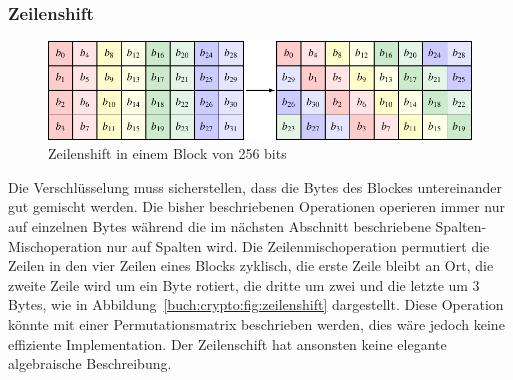 \subsubsection{Zeilenshift}
\begin{figure}
\centering
\includegraphics[width=\textwidth]{chapters/90-crypto/images/shift.pdf}
\caption{Zeilenshift in einem Block von 256 bits
\label{buch:crypto:fig:shift}}
\end{figure}
Die Verschlüsselung muss sicherstellen, dass die Bytes des Blockes
untereinander gut gemischt werden.
Die bisher beschriebenen Operationen operieren immer nur auf einzelnen
Bytes während
die im nächsten Abschnitt beschriebene Spalten-Mischoperation
nur auf Spalten wird.
Die Zeilenmischoperation permutiert die Zeilen in den vier Zeilen
eines Blocks zyklisch, die erste Zeile bleibt an Ort, die zweite
Zeile wird um ein Byte rotiert, die dritte um zwei und die letzte
um 3 Bytes, wie in Abbildung~\ref{buch:crypto:fig:zeilenshift}
dargestellt.
Diese Operation könnte mit einer Permutationsmatrix beschrieben werden,
dies wäre jedoch keine effiziente Implementation.
Der Zeilenschift hat ansonsten keine elegante algebraische Beschreibung.

